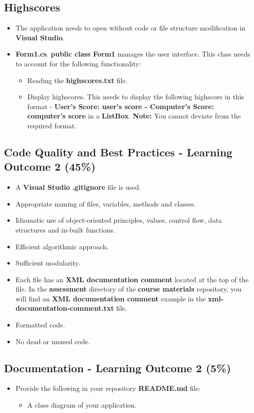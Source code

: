 \documentclass{article}
\begin{document}
\subsection*{Highscores}
\begin{itemize}
    \item The application needs to open without code or file structure modification in \textbf{Visual Studio}.
    \item \textbf{Form1.cs}. \textbf{public class Form1} manages the user interface. This class needs to account for the following functionality:
    \begin{itemize}
        \item Reading the \textbf{highscores.txt} file.  
        \item Display highscores. This needs to display the following highscore in this format - \textbf{User's Score: user's score - Computer's Score: computer's score} in a \textbf{ListBox}. \textbf{Note:} You cannot deviate from the required format.
    \end{itemize}
\end{itemize}

\subsection*{Code Quality and Best Practices - Learning Outcome 2 (45\%)}
\begin{itemize}
    \item A \textbf{Visual Studio} \textbf{.gitignore} file is used. 
    \item Appropriate naming of files, variables, methods and classes.
    \item Idiomatic use of object-oriented principles, values, control flow, data structures and in-built functions.
    \item Efficient algorithmic approach.
    \item Sufficient modularity.
    \item Each file has an \textbf{XML documentation comment} located at the top of the file. In the \textbf{assessment} directory of the \textbf{course materials} repository, you will find an \textbf{XML documentation comment} example in the \textbf{xml-documentation-comment.txt} file.
    \item Formatted code.
    \item No dead or unused code.
\end{itemize} 

\subsection*{Documentation - Learning Outcome 2 (5\%)}
\begin{itemize}
    \item Provide the following in your repository \textbf{README.md} file:
    \begin{itemize}
        \item A class diagram of your application.
    \end{itemize}
\end{itemize}
\end{document}
